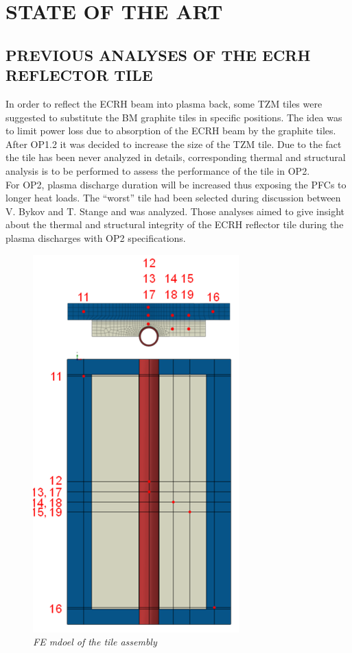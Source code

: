\chapter{STATE OF THE ART}
\section{ PREVIOUS ANALYSES OF THE ECRH REFLECTOR TILE}
\normalsize{In order to reflect the \acrshort{ECRH} beam into plasma back, some \acrshort{TZM} tiles were suggested to substitute the \acrshort{BM} graphite tiles in specific positions. The idea was to limit power loss due to absorption of the \acrshort{ECRH} beam by the graphite tiles. After \acrshort{OP1}.2 it was decided to increase the size of the \acrshort{TZM} tile. Due to the fact the tile has been never analyzed in details, corresponding thermal and structural analysis is to be performed to assess the performance of the tile in \acrshort{OP2}.}
\\
\break
\normalsize{\indent For \acrshort{OP2}, plasma discharge duration will be increased thus exposing the \acrshort{PFCs} to longer heat loads. The “worst” tile had been selected during discussion between V. Bykov and T. Stange and was analyzed. Those analyses aimed to give insight about the thermal and structural integrity of the \acrshort{ECRH} reflector tile during the plasma discharges with \acrshort{OP2} specifications.}
\\
\begin{figure}[h!]
    \centering
    \includegraphics[width=.45\textwidth]{figures/JFellingerFEModel.png}
    \caption{\it FE mdoel of the tile assembly \cite{Fellinger_2013}}
    \label{fig:fig_3_1}
\end{figure}

